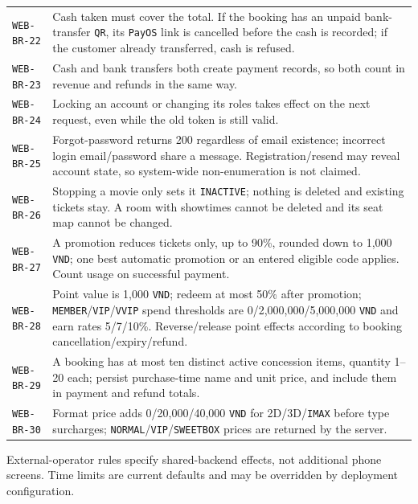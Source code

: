 \begin{longtable}{@{}P{0.23000\SRSWidth}P{0.77000\SRSWidth}@{}}
\texttt{WEB-\allowbreak{}BR-\allowbreak{}22} & Cash taken must cover the total. If the booking has an unpaid bank-transfer \texttt{QR}, its \texttt{Pay\allowbreak{}OS} link is cancelled before the cash is recorded; if the customer already transferred, cash is refused. \\[3pt]
\texttt{WEB-\allowbreak{}BR-\allowbreak{}23} & Cash and bank transfers both create payment records, so both count in revenue and refunds in the same way. \\[3pt]
\texttt{WEB-\allowbreak{}BR-\allowbreak{}24} & Locking an account or changing its roles takes effect on the next request, even while the old token is still valid. \\[3pt]
\texttt{WEB-\allowbreak{}BR-\allowbreak{}25} & Forgot-password returns 200 regardless of email existence; incorrect login email/\allowbreak{}password share a message. Registration/\allowbreak{}resend may reveal account state, so system-wide non-enumeration is not claimed. \\[3pt]
\texttt{WEB-\allowbreak{}BR-\allowbreak{}26} & Stopping a movie only sets it \texttt{INACTIVE\allowbreak{}}; nothing is deleted and existing tickets stay. A room with showtimes cannot be deleted and its seat map cannot be changed. \\[3pt]
\texttt{WEB-\allowbreak{}BR-\allowbreak{}27} & A promotion reduces tickets only, up to 90\%, rounded down to 1,000 \texttt{VND}; one best automatic promotion or an entered eligible code applies. Count usage on successful payment. \\[3pt]
\texttt{WEB-\allowbreak{}BR-\allowbreak{}28} & Point value is 1,000 \texttt{VND}; redeem at most 50\% after promotion; \texttt{MEMBER}/\allowbreak{}\texttt{VIP}/\allowbreak{}\texttt{VVIP} spend thresholds are 0/\allowbreak{}2,000,000/\allowbreak{}5,000,000 \texttt{VND} and earn rates 5/\allowbreak{}7/\allowbreak{}10\%. Reverse/\allowbreak{}release point effects according to booking cancellation/\allowbreak{}expiry/\allowbreak{}refund. \\[3pt]
\texttt{WEB-\allowbreak{}BR-\allowbreak{}29} & A booking has at most ten distinct active concession items, quantity 1–20 each; persist purchase-time name and unit price, and include them in payment and refund totals. \\[3pt]
\texttt{WEB-\allowbreak{}BR-\allowbreak{}30} & Format price adds 0/\allowbreak{}20,000/\allowbreak{}40,000 \texttt{VND} for 2D/\allowbreak{}3D/\allowbreak{}\texttt{IMAX} before type surcharges; \texttt{NORMAL}/\allowbreak{}\texttt{VIP}/\allowbreak{}\texttt{SWEETBOX\allowbreak{}} prices are returned by the server. \\[3pt]
\end{longtable}
\endgroup

External-operator rules specify shared-backend effects, not additional phone screens. Time limits are current defaults and may be overridden by deployment configuration.

